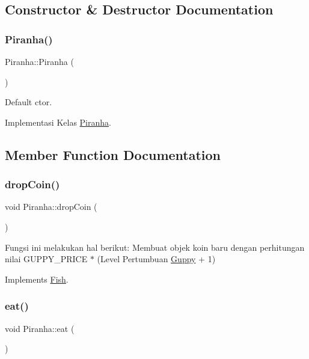 \subsection{Constructor \& Destructor Documentation}
\mbox{\label{class_piranha_a7e3a4c5c7f458c16717c8cb997fc0331}} 
\subsubsection{\texorpdfstring{Piranha()}{Piranha()}}
{\footnotesize\ttfamily Piranha\+::\+Piranha (\begin{DoxyParamCaption}{ }\end{DoxyParamCaption})}



Default ctor. 

Implementasi Kelas \mbox{\hyperlink{class_piranha}{Piranha}}. 

\subsection{Member Function Documentation}
\mbox{\label{class_piranha_aee107987f36631002f04c5283564382b}} 
\subsubsection{\texorpdfstring{drop\+Coin()}{dropCoin()}}
{\footnotesize\ttfamily void Piranha\+::drop\+Coin (\begin{DoxyParamCaption}{ }\end{DoxyParamCaption})\hspace{0.3cm}{\ttfamily [virtual]}}

Fungsi ini melakukan hal berikut\+: Membuat objek koin baru dengan perhitungan nilai G\+U\+P\+P\+Y\+\_\+\+P\+R\+I\+CE $\ast$ (Level Pertumbuan \mbox{\hyperlink{class_guppy}{Guppy}} + 1) 

Implements \mbox{\hyperlink{class_fish}{Fish}}.

\mbox{\label{class_piranha_ac48c0256edd56c427b3d82f6e0d4df82}} 
\subsubsection{\texorpdfstring{eat()}{eat()}}
{\footnotesize\ttfamily void Piranha\+::eat (\begin{DoxyParamCaption}{ }\end{DoxyParamCaption})\hspace{0.3cm}{\ttfamily [virtual]}}

